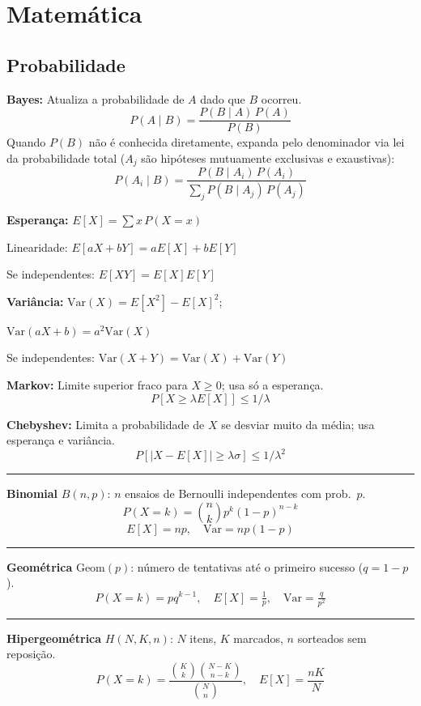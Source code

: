 \setlength{\parindent}{0pt}

\section{Matemática}

\subsection{Probabilidade}

\textbf{Bayes:} Atualiza a probabilidade de $A$ dado que $B$ ocorreu.
\[P(A\mid B)=\frac{P(B\mid A)\,P(A)}{P(B)}\]
Quando $P(B)$ não é conhecida diretamente, expanda pelo denominador via lei da probabilidade total ($A_j$ são hipóteses mutuamente exclusivas e exaustivas):
\[P(A_i\mid B)=\frac{P(B\mid A_i)\,P(A_i)}{\sum_j P(B\mid A_j)\,P(A_j)}\]

\textbf{Esperança:} $E[X]=\sum x\,P(X{=}x)$

Linearidade: $E[aX+bY]=aE[X]+bE[Y]$

Se independentes: $E[XY]=E[X]E[Y]$

\textbf{Variância:} $\text{Var}(X)=E[X^2]-E[X]^2$; 

$\text{Var}(aX+b)=a^2\text{Var}(X)$

Se independentes: $\text{Var}(X+Y)=\text{Var}(X)+\text{Var}(Y)$

\vspace{4pt}

\textbf{Markov:} Limite superior fraco para $X\geq0$; usa só a esperança.
\[P[X\geq\lambda E[X]]\leq1/\lambda\]

\textbf{Chebyshev:} Limita a probabilidade de $X$ se desviar muito da média; usa esperança e variância.
\[P[|X-E[X]|\geq\lambda\sigma]\leq1/\lambda^2\]

\noindent\rule{\linewidth}{0.2pt}

\textbf{Binomial} $B(n,p)$: $n$ ensaios de Bernoulli independentes com prob.\ $p$.
\[P(X=k)=\binom{n}{k}p^k(1-p)^{n-k}\]
\[E[X]=np, \quad \text{Var}=np(1-p)\]

\noindent\rule{\linewidth}{0.2pt}

\textbf{Geométrica} $\text{Geom}(p)$: número de tentativas até o primeiro sucesso ($q=1-p$).
\[P(X=k)=pq^{k-1}, \quad E[X]=\tfrac{1}{p}, \quad \text{Var}=\tfrac{q}{p^2}\]

\noindent\rule{\linewidth}{0.2pt}

\textbf{Hipergeométrica} $H(N,K,n)$: $N$ itens, $K$ marcados, $n$ sorteados sem reposição.
\[P(X=k)=\frac{\binom{K}{k}\binom{N-K}{n-k}}{\binom{N}{n}}, \quad E[X]=\frac{nK}{N}\]

